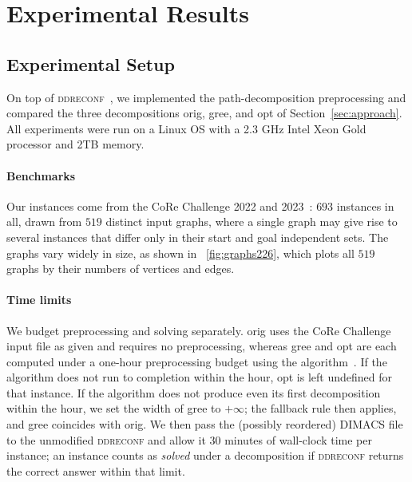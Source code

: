 \documentclass[conference]{IEEEtran}
\newcommand{\OrigDecom}{\textsf{orig}\xspace}
\newcommand{\HeurDecom}{\textsf{gree}\xspace}
\newcommand{\OptDecom}{\textsf{opt}\xspace}
\begin{document}
\section{Experimental Results}
\label{sec:experiments}

\subsection{Experimental Setup}
\label{subsec:setup}

On top of \textsc{ddreconf}~\cite{ItoKNSSTT23}, we implemented the
path-decomposition preprocessing and compared the three decompositions
\OrigDecom, \HeurDecom, and \OptDecom of Section~\ref{sec:approach}.
All experiments were run on a Linux OS with a 2.3 GHz Intel Xeon Gold processor and 2TB memory.

\paragraph{Benchmarks}
Our instances come from the CoRe Challenge 2022 and 2023~\cite{sotaokit24}:
$693$ instances in all, drawn from $519$ distinct input graphs, where a single
graph may give rise to several instances that differ only in their start and goal
independent sets. The graphs vary widely in size, as shown in
\figurename~\ref{fig:graphs226}, which plots all $519$ graphs by their numbers of
vertices and edges.

\paragraph{Time limits}
We budget preprocessing and solving separately. \OrigDecom uses the CoRe Challenge input
file as given and requires no preprocessing, whereas \HeurDecom and \OptDecom are each
computed under a one-hour preprocessing budget using the algorithm~\cite{KobayashiKomuroTamaki2014}. 
If the algorithm does not run to completion within the hour, \OptDecom is left undefined for that instance.  
If the algorithm does not produce even its first decomposition within the hour,
we set the width of \HeurDecom to $+\infty$; the fallback rule then applies, and
\HeurDecom coincides with \OrigDecom.
We then pass the (possibly reordered) DIMACS file to the unmodified
\textsc{ddreconf} and allow it $30$ minutes of wall-clock time per instance; an
instance counts as \emph{solved} under a decomposition if \textsc{ddreconf}
returns the correct answer within that limit. 
\end{document}
